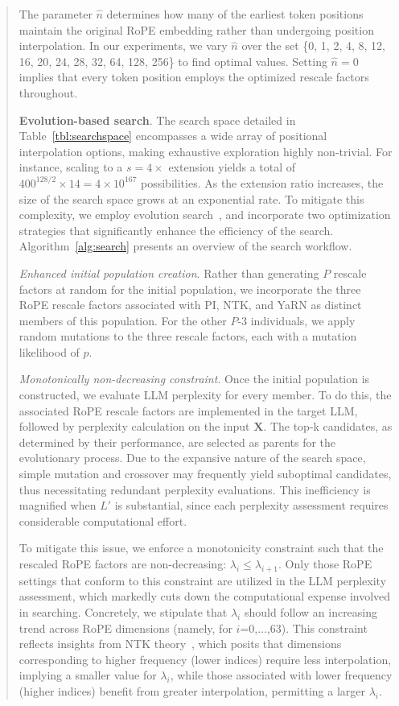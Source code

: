 \begin{abstract}
The parameter $\hat{n}$ determines how many of the earliest token positions maintain the original RoPE embedding rather than undergoing position interpolation. In our experiments, we vary $\hat{n}$ over the set \{0, 1, 2, 4, 8, 12, 16, 20, 24, 28, 32, 64, 128, 256\} to find optimal values. Setting $\hat{n}=0$ implies that every token position employs the optimized rescale factors throughout.

\textbf{Evolution-based search}. The search space detailed in Table~\ref{tbl:searchspace} encompasses a wide array of positional interpolation options, making exhaustive exploration highly non-trivial. For instance, scaling to a $s=4\times$ extension yields a total of $400^{128/2}\times14 = 4\times10^{167}$ possibilities. As the extension ratio increases, the size of the search space grows at an exponential rate. To mitigate this complexity, we employ evolution search~\cite{guo2020single}, and incorporate two optimization strategies that significantly enhance the efficiency of the search. Algorithm~\ref{alg:search} presents an overview of the search workflow.

\textit{Enhanced initial population creation}. Rather than generating $P$ rescale factors at random for the initial population, we incorporate the three RoPE rescale factors associated with PI, NTK, and YaRN as distinct members of this population. For the other $P$-3 individuals, we apply random mutations to the three rescale factors, each with a mutation likelihood of $p$.

\textit{Monotonically non-decreasing constraint}. Once the initial population is constructed, we evaluate LLM perplexity for every member. To do this, the associated RoPE rescale factors are implemented in the target LLM, followed by perplexity calculation on the input $\mathbf{X}$. The top-k candidates, as determined by their performance, are selected as parents for the evolutionary process. Due to the expansive nature of the search space, simple mutation and crossover may frequently yield suboptimal candidates, thus necessitating redundant perplexity evaluations. This inefficiency is magnified when $L'$ is substantial, since each perplexity assessment requires considerable computational effort.

To mitigate this issue, we enforce a monotonicity constraint such that the rescaled RoPE factors are non-decreasing: $\lambda_i\le \lambda_{i+1}$. Only those RoPE settings that conform to this constraint are utilized in the LLM perplexity assessment, which markedly cuts down the computational expense involved in searching. Concretely, we stipulate that $\lambda_i$ should follow an increasing trend across RoPE dimensions (namely, for $i$=0,...,63). This constraint reflects insights from NTK theory~\cite{jacot2018neural,tancik2020fourier,ntk}, which posits that dimensions corresponding to higher frequency (lower indices) require less interpolation, implying a smaller value for $\lambda_i$, while those associated with lower frequency (higher indices) benefit from greater interpolation, permitting a larger $\lambda_i$.


\end{abstract}
